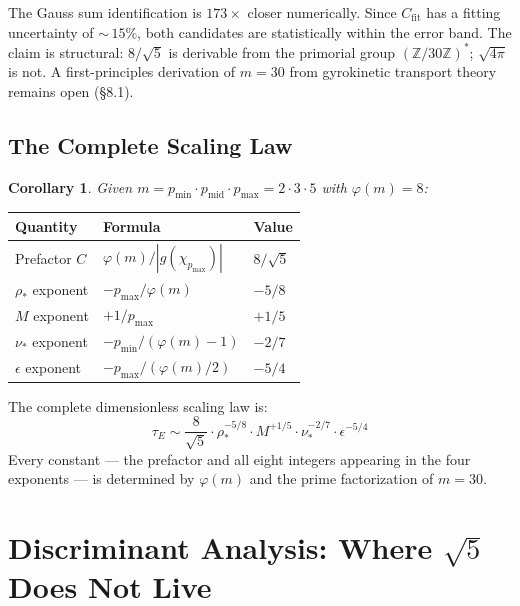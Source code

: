 \documentclass[11pt,letterpaper]{article}
\newtheorem{corollary}[theorem]{Corollary}
\theoremstyle{definition}
\begin{document}
The Gauss sum identification is $173\times$ closer numerically. Since $C_{\text{fit}}$ has a fitting uncertainty of ${\sim}\,15\%$, both candidates are statistically within the error band. The claim is structural: $8/\sqrt{5}$ is derivable from the primorial group $(\mathbb{Z}/30\mathbb{Z})^*$; $\sqrt{4\pi}$ is not. A first-principles derivation of $m = 30$ from gyrokinetic transport theory remains open (\S8.1).

\subsection{The Complete Scaling Law}

\begin{corollary}
Given $m = p_{\text{min}} \cdot p_{\text{mid}} \cdot p_{\text{max}} = 2 \cdot 3 \cdot 5$ with $\varphi(m) = 8$:
\end{corollary}

\begin{center}
\begin{tabular}{@{}lll@{}}
\toprule
Quantity & Formula & Value \\
\midrule
Prefactor $C$       & $\varphi(m) / |g(\chi_{p_{\text{max}}})|$ & $8/\sqrt{5}$ \\
$\rho_*$ exponent   & $-p_{\text{max}} / \varphi(m)$            & $-5/8$       \\
$M$ exponent        & $+1 / p_{\text{max}}$                     & $+1/5$       \\
$\nu_*$ exponent    & $-p_{\text{min}} / (\varphi(m) - 1)$      & $-2/7$       \\
$\epsilon$ exponent & $-p_{\text{max}} / (\varphi(m)/2)$        & $-5/4$       \\
\bottomrule
\end{tabular}
\end{center}

The complete dimensionless scaling law is:
\[
\tau_E \sim \frac{8}{\sqrt{5}} \cdot \rho_*^{-5/8} \cdot M^{+1/5}
           \cdot \nu_*^{-2/7} \cdot \epsilon^{-5/4}
\]
Every constant --- the prefactor and all eight integers appearing in the four exponents --- is determined by $\varphi(m)$ and the prime factorization of $m = 30$.


\section{Discriminant Analysis: Where $\sqrt{5}$ Does Not Live}
\end{document}
